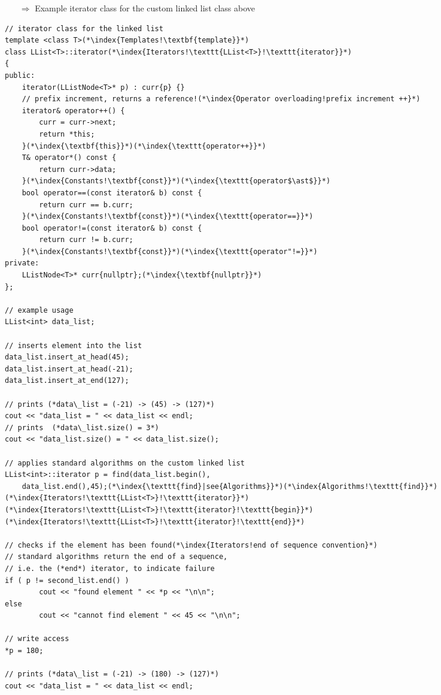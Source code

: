 \documentclass[10pt]{book}
\begin{document}
\begin{enumerate}
\item[$\Rightarrow$] Example iterator class for the custom linked list class above
\end{enumerate}
\begin{lstlisting}
// iterator class for the linked list
template <class T>(*\index{Templates!\textbf{template}}*)
class LList<T>::iterator(*\index{Iterators!\texttt{LList<T>}!\texttt{iterator}}*)
{
public:
    iterator(LListNode<T>* p) : curr{p} {}
    // prefix increment, returns a reference!(*\index{Operator overloading!prefix increment ++}*)
    iterator& operator++() {
        curr = curr->next;
        return *this;
    }(*\index{\textbf{this}}*)(*\index{\texttt{operator++}}*)
    T& operator*() const {
        return curr->data;
    }(*\index{Constants!\textbf{const}}*)(*\index{\texttt{operator$\ast$}}*)
    bool operator==(const iterator& b) const {
        return curr == b.curr;
    }(*\index{Constants!\textbf{const}}*)(*\index{\texttt{operator==}}*)
    bool operator!=(const iterator& b) const {
        return curr != b.curr;
    }(*\index{Constants!\textbf{const}}*)(*\index{\texttt{operator"!=}}*)
private:
    LListNode<T>* curr{nullptr};(*\index{\textbf{nullptr}}*)
};

// example usage
LList<int> data_list;

// inserts element into the list
data_list.insert_at_head(45);
data_list.insert_at_head(-21);
data_list.insert_at_end(127);

// prints (*data\_list = (-21) -> (45) -> (127)*)
cout << "data_list = " << data_list << endl;
// prints  (*data\_list.size() = 3*)
cout << "data_list.size() = " << data_list.size();

// applies standard algorithms on the custom linked list
LList<int>::iterator p = find(data_list.begin(),
    data_list.end(),45);(*\index{\texttt{find}|see{Algorithms}}*)(*\index{Algorithms!\texttt{find}}*)(*\index{Iterators!\texttt{LList<T>}!\texttt{iterator}}*)(*\index{Iterators!\texttt{LList<T>}!\texttt{iterator}!\texttt{begin}}*)(*\index{Iterators!\texttt{LList<T>}!\texttt{iterator}!\texttt{end}}*)

// checks if the element has been found(*\index{Iterators!end of sequence convention}*)
// standard algorithms return the end of a sequence, 
// i.e. the (*end*) iterator, to indicate failure
if ( p != second_list.end() )
        cout << "found element " << *p << "\n\n";
else
        cout << "cannot find element " << 45 << "\n\n";

// write access
*p = 180;

// prints (*data\_list = (-21) -> (180) -> (127)*)
cout << "data_list = " << data_list << endl;
\end{lstlisting}
%
%
\end{document}
